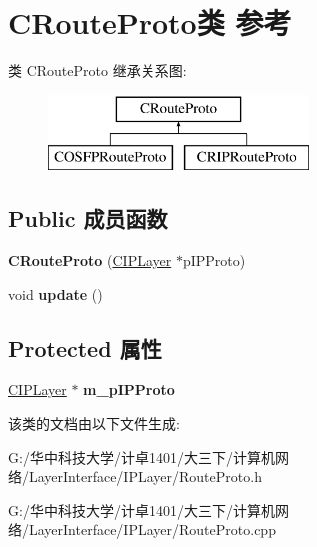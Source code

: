 \hypertarget{class_c_route_proto}{}\section{C\+Route\+Proto类 参考}
\label{class_c_route_proto}
类 C\+Route\+Proto 继承关系图\+:\begin{figure}[H]
\begin{center}
\leavevmode
\includegraphics[height=2.000000cm]{class_c_route_proto}
\end{center}
\end{figure}
\subsection*{Public 成员函数}
\begin{DoxyCompactItemize}
\item 
\mbox{\label{class_c_route_proto_a0af8908129d928acbadf7eba99d9b7e2}} 
{\bfseries C\+Route\+Proto} (\hyperlink{class_c_i_p_layer}{C\+I\+P\+Layer} $\ast$p\+I\+P\+Proto)
\item 
\mbox{\label{class_c_route_proto_ac17d99e82f088ed1b50426584c65b2d1}} 
void {\bfseries update} ()
\end{DoxyCompactItemize}
\subsection*{Protected 属性}
\begin{DoxyCompactItemize}
\item 
\mbox{\label{class_c_route_proto_a215ec5768c5e1c1d1350506b800f3d02}} 
\hyperlink{class_c_i_p_layer}{C\+I\+P\+Layer} $\ast$ {\bfseries m\+\_\+p\+I\+P\+Proto}
\end{DoxyCompactItemize}


该类的文档由以下文件生成\+:\begin{DoxyCompactItemize}
\item 
G\+:/华中科技大学/计卓1401/大三下/计算机网络/\+Layer\+Interface/\+I\+P\+Layer/Route\+Proto.\+h\item 
G\+:/华中科技大学/计卓1401/大三下/计算机网络/\+Layer\+Interface/\+I\+P\+Layer/Route\+Proto.\+cpp\end{DoxyCompactItemize}

